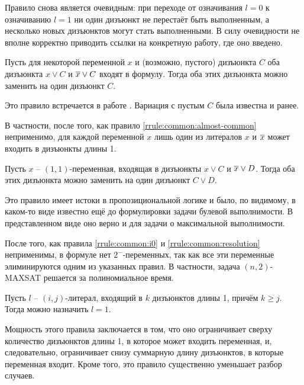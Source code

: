 Правило снова является очевидным: при переходе от означивания $l = 0$ к означиванию $l = 1$ ни один дизъюнкт не перестаёт быть выполненным, а несколько новых дизъюнктов могут стать выполненными. В силу очевидности не вполне корректно приводить ссылки на конкретную работу, где оно введено.

\begin{rrule}
 Пусть для некоторой переменной $x$ и (возможно, пустого) дизъюнкта $C$ оба дизъюнкта $x \vee C$ и $\overline{x} \vee C$ входят в формулу. Тогда оба этих дизъюнкта можно заменить на один дизъюнкт $C$.
 \label{rrule:common:almost-common}
\end{rrule}

Это правило встречается в работе \cite{bansal99}. Вариация с пустым $C$ была известна и ранее.

\begin{note}
 В частности, после того, как правило \ref{rrule:common:almost-common} неприменимо, для каждой переменной $x$ лишь один из литералов $x$ и $\overline{x}$ может входить в дизъюнкты длины 1.
\end{note}

\begin{rrule}
 Пусть $x$ -- $(1,1)$-переменная, входящая в дизъюнкты $x \vee C$ и $\overline{x} \vee D$. Тогда оба этих дизъюнкта можно заменить на один дизъюнкт $C \vee D$.
 \label{rrule:common:resolution}
\end{rrule}

Это правило имеет истоки в пропозициональной логике и было, по видимому, в каком-то виде известно ещё до формулировки задачи булевой выполнимости. В представленном виде оно верно и для задачи о максимальной выполнимости.

\begin{note}
 После того, как правила \ref{rrule:common:i0} и \ref{rrule:common:resolution} неприменимы, в формуле нет $2^-$-переменных, так как все эти переменные элиминируются одним из указанных правил. В частности, задача $(n,2)$-MAXSAT решается за полиномиальное время.
\end{note}

\begin{rrule}
 Пусть $l$ -- $(i,j)$-литерал, входящий в $k$ дизъюнктов длины 1, причём $k \geq j$. Тогда можно назначить $l = 1$.
 \label{rrule:common:unit-clauses}
\end{rrule}

Мощность этого правила заключается в том, что оно ограничивает сверху количество дизъюнктов длины 1, в которое может входить переменная, и, следовательно, ограничивает снизу суммарную длину дизъюнктов, в которые переменная входит. Кроме того, это правило существенно уменьшает разбор случаев.

